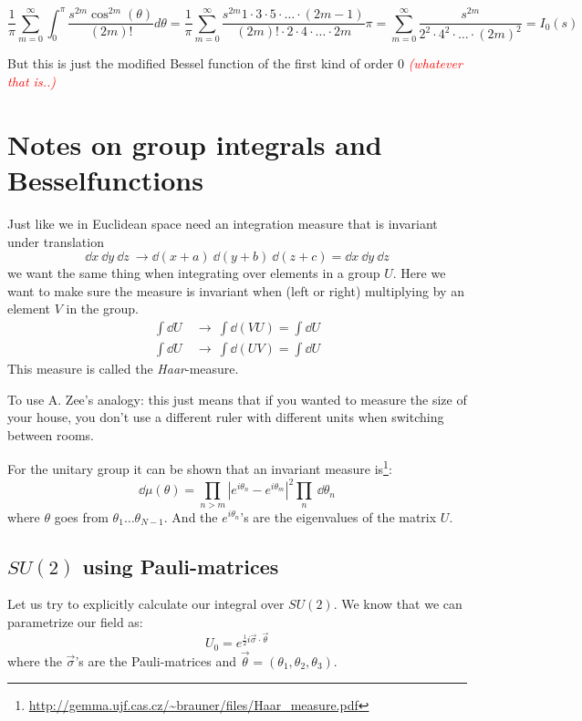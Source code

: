 \documentclass[a4,10pt,titlepage]{article}
\renewcommand\[{\begin{equation*}}
\renewcommand\]{\end{equation*}}
\newcommand{\be}{\begin{equation}}
\newcommand{\ee}{\end{equation}}
\numberwithin{equation}{section}
\newcommand{\lp}{\left}
\newcommand{\rp}{\right}
\newcommand{\edit}[1]{\textcolor{red}{\textit{#1}}}
\begin{document}
\be
\frac{1}{\pi}\sum_{m=0}^{\infty}\int_{0}^{\pi}\frac{s^{2m}\cos^{2m}(\theta)}{(2m)!}d\theta = \frac{1}{\pi}\sum_{m=0}^{\infty}\frac{s^{2m}1\cdot3\cdot5\cdot \ldots \cdot (2m-1)}{(2m)!\cdot 2 \cdot 4\cdot \ldots\cdot 2m}\pi=\sum_{m=0}^{\infty}\frac{s^{2m}}{2^2 \cdot 4^2\cdot \ldots\cdot (2m)^2}=I_0(s)
\ee

But this is just the modified Bessel function of the first kind of order 0 \edit{(whatever that is..)}

\section{Notes on group integrals and Besselfunctions}
Just like we in Euclidean space need an integration measure that is invariant under translation
\[
\dd x\:\dd y\:\dd z\:\rightarrow \dd(x+a)\:\dd(y+b)\:\dd(z+c)=\dd x\:\dd y\:\dd z
\]
we want the same thing when integrating over elements in a group $U$. Here we want to make sure the measure is invariant when (left or right) multiplying by an element $V$ in the group.
\begin{align*}
\int \dd U\:&\rightarrow \:\int \dd(V U)=\int \dd U\\
\int \dd U\:&\rightarrow \:\int \dd(U V)=\int \dd U
\end{align*}
This measure is called the \textit{Haar}-measure.

To use A. Zee's analogy: this just means that if you wanted to measure the size of your house, you don't use a different ruler with different units when switching between rooms.

For the unitary group it can be shown that an invariant measure is\footnote{\url{http://gemma.ujf.cas.cz/~brauner/files/Haar_measure.pdf}}:
\be \label{eq:haar-measure}
\dd \mu(\theta)=\prod_{n>m}\lp|e^{i\theta_n}-e^{i\theta_m}\rp|^2\prod_n\:\dd\theta_n
\ee
where $\theta$ goes from $\theta_1\dots\theta_{N-1}$. And the $e^{i\theta_n}$'s are the eigenvalues of the matrix $U$.

\subsection*{$SU(2)$ using Pauli-matrices}
Let us try to explicitly calculate our integral over $SU(2)$. We know that we can parametrize our field as:
\[
U_0=e^{\frac{1}{2}i\vec{\sigma}\cdot \vec{\theta}}
\]
where the $\vec{\sigma}$'s are the Pauli-matrices and $\vec{\theta}=(\theta_1,\theta_2,\theta_3)$.
\end{document}
